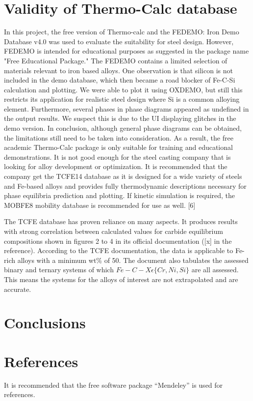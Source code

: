 \documentclass[11pt]{article}
\begin{document}
\section{Validity of Thermo-Calc database}
In this project, the free version of Thermo-calc and the FEDEMO: Iron Demo Database v4.0 was used to evaluate the suitability for steel design. However, FEDEMO is intended for educational purposes as suggested in the package name "Free Educational Package." The FEDEMO contains a limited selection of materials relevant to iron based alloys. One observation is that silicon is not included in the demo database, which then became a road blocker of Fe-C-Si calculation and plotting. We were able to plot it using OXDEMO, but still this restricts its application for realistic steel design where Si is a common alloying element. Furthermore, several phases in phase diagrams appeared as undefined in the output results. We suspect this is due to the UI displaying glitches in the demo version. In conclusion, although general phase diagrams can be obtained, the limitations still need to be taken into consideration. 
As a result, the free academic Thermo-Calc package is only suitable for training and educational demonstrations. It is not good enough for the steel casting company that is looking for alloy development or optimization. It is recommended that the company get the TCFE14 database as it is designed for a wide variety of steels and Fe-based alloys and provides fully thermodynamic descriptions necessary for phase equilibria prediction and plotting.  If kinetic simulation is required, the MOBFE8 mobility database is recommended for use as well. [6]

The TCFE database has proven reliance on many aspects. It produces results with strong correlation between calculated values for carbide equilibrium compositions shown in figures 2 to 4 in its official documentation ([x] in the reference). According to the TCFE documentation, the data is applicable to Fe-rich alloys with a minimum wt\% of 50. The document also tabulates the assessed binary and ternary systems of which $Fe-C-X \epsilon \{Cr, Ni, Si\}$ are all assessed. This means the systems for the alloys of interest are not extrapolated and are accurate.
\section{Conclusions}
\section{References}
It is recommended that the free software package 
“Mendeley” is used for references.
\end{document}
